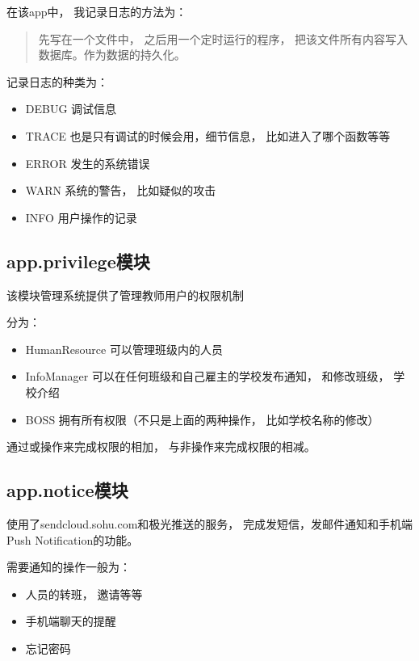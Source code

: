 在该app中， 我记录日志的方法为：

\begin{quote}
  先写在一个文件中， 之后用一个定时运行的程序， 把该文件所有内容写入数据库。作为数据的持久化。
\end{quote}


记录日志的种类为：

\begin{itemize}
\item DEBUG 调试信息
\item TRACE 也是只有调试的时候会用，细节信息， 比如进入了哪个函数等等
\item ERROR 发生的系统错误
\item WARN  系统的警告， 比如疑似的攻击
\item INFO  用户操作的记录
\end{itemize}





\subsection{app.privilege模块}

该模块管理系统提供了管理教师用户的权限机制

分为：
\begin{itemize}
\item HumanResource 可以管理班级内的人员
\item InfoManager 可以在任何班级和自己雇主的学校发布通知， 和修改班级， 学校介绍
\item BOSS 拥有所有权限（不只是上面的两种操作， 比如学校名称的修改）
\end{itemize}

通过或操作来完成权限的相加， 与非操作来完成权限的相减。



\subsection{app.notice模块}

使用了sendcloud.sohu.com和极光推送的服务， 完成发短信，发邮件通知和手机端Push Notification的功能。

需要通知的操作一般为：

\begin{itemize}
\item 人员的转班， 邀请等等
\item 手机端聊天的提醒
\item 忘记密码
\end{itemize}




